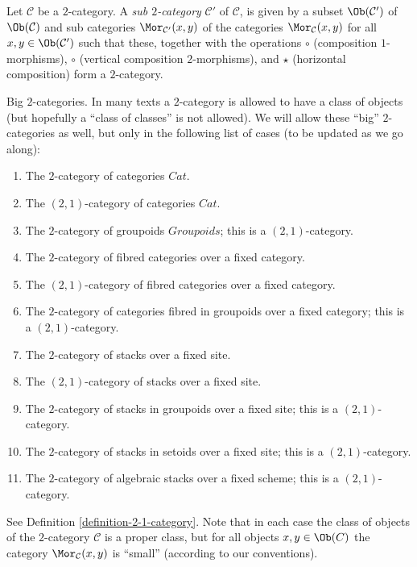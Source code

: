 \begin{definition}
\label{definition-sub-2-category}
Let $\mathcal{C}$ be a $2$-category.
A {\it sub $2$-category} $\mathcal{C}'$ of $\mathcal{C}$, is given by a subset
$\Ob(\mathcal{C}')$ of $\Ob(\mathcal{C})$
and sub categories $\Mor_{\mathcal{C}'}(x, y)$ of the
categories $\Mor_\mathcal{C}(x, y)$ for all
$x, y \in \Ob(\mathcal{C}')$ such that these, together with
the operations $\circ$ (composition $1$-morphisms), $\circ$ (vertical
composition $2$-morphisms), and $\star$ (horizontal composition)
form a $2$-category.
\end{definition}

\begin{remark}
\label{remark-big-2-categories}
Big $2$-categories.
In many texts a $2$-category is allowed to have a class of
objects (but hopefully a ``class of classes'' is not allowed).
We will allow these ``big'' $2$-categories as well, but only
in the following list of cases (to be updated as we go along):
\begin{enumerate}
\item The $2$-category of categories $\textit{Cat}$.
\item The $(2, 1)$-category of categories $\textit{Cat}$.
\item The $2$-category of groupoids $\textit{Groupoids}$;
this is a $(2, 1)$-category.
\item The $2$-category of fibred categories over a fixed category.
\item The $(2, 1)$-category of fibred categories over a fixed category.
\item The $2$-category of categories fibred in groupoids over a fixed category;
this is a $(2, 1)$-category.
\item The $2$-category of stacks over a fixed site.
\item The $(2, 1)$-category of stacks over a fixed site.
\item The $2$-category of stacks in groupoids over a fixed site;
this is a $(2, 1)$-category.
\item The $2$-category of stacks in setoids over a fixed site;
this is a $(2, 1)$-category.
\item The $2$-category of algebraic stacks over a fixed scheme;
this is a $(2, 1)$-category.
\end{enumerate}
See Definition \ref{definition-2-1-category}.
Note that in each case the class of objects of the $2$-category
$\mathcal{C}$ is a proper class, but for all objects $x, y \in \Ob(C)$
the category $\Mor_\mathcal{C}(x, y)$ is ``small'' (according to
our conventions).
\end{remark}

